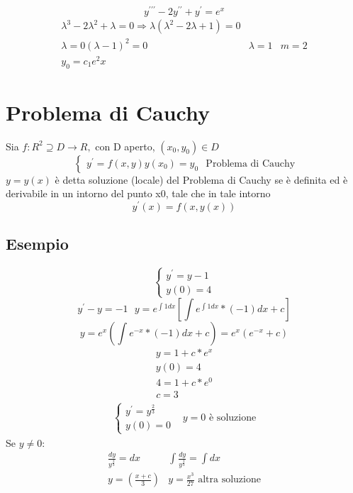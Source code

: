 \begin{equation}
	y^{\prime\prime\prime}-2y^{\prime\prime}+y^\prime=e^x
\end{equation}
\begin{eqnarray*}
	\lambda^3-2\lambda^2+\lambda=0\Rightarrow\lambda(\lambda^2-2\lambda+1)=0\\
	\lambda=0(\lambda-1)^2=0&\lambda=1&m=2\\
	y_0=c_1e^2x
\end{eqnarray*}
\section{Problema di Cauchy}
Sia $f:R^2\supseteq D\to R,$ con D aperto, $(x_0,y_0)\in D$
\begin{equation*}
	\begin{cases}
		y^\prime=f(x,y)
		y(x_0)=y_0
	\end{cases} \text{ Problema di Cauchy}
\end{equation*}
$y=y(x)$ è detta soluzione (locale) del Problema di
Cauchy se è definita ed è derivabile in un intorno del
punto x0, tale che in tale intorno
\begin{equation*}
	y^\prime(x)=f(x,y(x))
\end{equation*}
\subsection{Esempio}
\begin{equation}
	\begin{cases}
		y^\prime=y-1\\
		y(0)=4
	\end{cases}
\end{equation}
\begin{equation*}
	y^\prime-y=-1\text{ } y=e^{\int1dx}\left[\int e^{\int1dx}*(-1)dx+c\right]
\end{equation*}
\begin{equation*}
	y=e^x\left(\int e^{-x}*(-1)dx+c\right)=e^x\left(e^{-x}+c\right)
\end{equation*}
\begin{eqnarray*}
	y=1+c*e^x\\
	y(0)=4
\end{eqnarray*}
\begin{eqnarray*}
	4=1+c*e^0\\
	c=3
\end{eqnarray*}
\begin{eqnarray}
	\begin{cases}
		y^\prime=y^{\frac{2}{3}}\\
		y(0)=0
	\end{cases}&y=0 \text{ è soluzione}
\end{eqnarray}
Se $y\neq 0:$
\begin{equation*}
	\begin{matrix}
		\frac{dy}{y^{\frac{2}{3}}}=dx&\int\frac{dy}{y^\frac{2}{3}}=\int dx\\
		y=\left(\frac{x+c}{3}\right)&y=\frac{x^3}{27} \text{ altra soluzione}
	\end{matrix}
\end{equation*}

